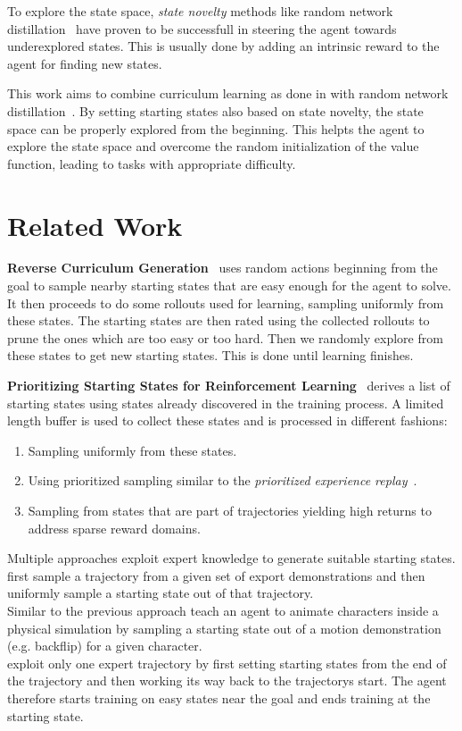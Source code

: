 \documentclass{article}
\begin{document}
To explore the state space, \textit{state novelty} methods like random network distillation~\citep{rnd} have proven to be successfull in steering the agent towards underexplored states. This is usually done by adding an intrinsic reward to the agent for finding new states.

This work aims to combine curriculum learning as done in \cite{prox_curr} with random network distillation~\citep{rnd}. By setting starting states also based on state novelty, the state space can be properly explored from the beginning. This helpts the agent to explore the state space and overcome the random initialization of the value function, leading to tasks with appropriate difficulty.

\section{Related Work}


\textbf{Reverse Curriculum Generation}~\citep{reverse_curr_gen} uses random actions beginning from the goal to sample nearby starting states that are easy enough for the agent to solve. It then proceeds to do some rollouts used for learning, sampling uniformly from these states. The starting states are then rated using the collected rollouts to prune the ones which are too easy or too hard. Then we randomly explore from these states to get new starting states. This is done until learning finishes.

\textbf{Prioritizing Starting States for Reinforcement Learning}~\citep{prio_start_states} derives a list of starting states using states already discovered in the training process. A limited length buffer is used to collect these states and is processed in different fashions:
\begin{enumerate}
  \item Sampling uniformly from these states.
  \item Using prioritized sampling similar to the \textit{prioritized experience replay}~\citep{prio_exp_replay}.
  \item Sampling from states that are part of trajectories yielding high returns to address sparse reward domains.
\end{enumerate}


Multiple approaches exploit expert knowledge to generate suitable starting states. \\
\cite{overcoming_exploration} first sample a trajectory from a given set of export demonstrations and then uniformly sample a starting state out of that trajectory. \\
Similar to the previous approach \cite{deepmimic} teach an agent to animate characters inside a physical simulation by sampling a starting state out of a motion demonstration (e.g. backflip) for a given character. \\
\cite{montezuma_demonstration} exploit only one expert trajectory by first setting starting states from the end of the trajectory and then working its way back to the trajectorys start. The agent therefore starts training on easy states near the goal and ends training at the starting state.
\end{document}
